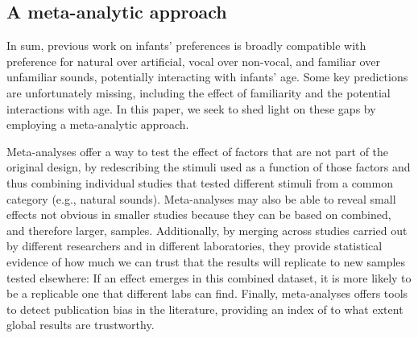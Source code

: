 \documentclass[man]{apa6}
\begin{document}
\subsection{A meta-analytic approach}\label{a-meta-analytic-approach}

In sum, previous work on infants' preferences is broadly compatible with
preference for natural over artificial, vocal over non-vocal, and
familiar over unfamiliar sounds, potentially interacting with infants'
age. Some key predictions are unfortunately missing, including the
effect of familiarity and the potential interactions with age. In this
paper, we seek to shed light on these gaps by employing a meta-analytic
approach.

Meta-analyses offer a way to test the effect of factors that are not
part of the original design, by redescribing the stimuli used as a
function of those factors and thus combining individual studies that
tested different stimuli from a common category (e.g., natural sounds).
Meta-analyses may also be able to reveal small effects not obvious in
smaller studies because they can be based on combined, and therefore
larger, samples. Additionally, by merging across studies carried out by
different researchers and in different laboratories, they provide
statistical evidence of how much we can trust that the results will
replicate to new samples tested elsewhere: If an effect emerges in this
combined dataset, it is more likely to be a replicable one that
different labs can find. Finally, meta-analyses offers tools to detect
publication bias in the literature, providing an index of to what extent
global results are trustworthy.
\end{document}
